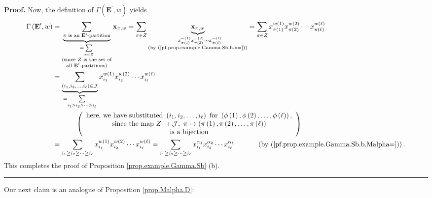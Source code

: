 \documentclass[numbers=enddot,12pt,final,onecolumn,notitlepage,abstracton]{scrartcl}
\theoremstyle{definition}
\newenvironment{proof}[1][Proof]{\noindent\textbf{#1.} }{\ \rule{0.5em}{0.5em}}
\let\sumnonlimits\sum
\renewcommand{\sum}{\sumnonlimits\limits}
\newenvironment{verlong}{}{}
\begin{document}
\begin{verlong}
\begin{footnotesize}
\begin{proof}
Now, the definition of $\Gamma\left(  \mathbf{E}^{\prime},w\right)  $ yields%
\begin{align*}
\Gamma\left(  {\mathbf{E}}^{\prime},w\right)   &  =\underbrace{\sum_{\pi\text{
is an }{\mathbf{E}}^{\prime}\text{-partition}}}_{\substack{=\sum_{\pi\in
Z}\\\text{(since }Z\text{ is the set of}\\\text{all }\mathbf{E}^{\prime
}\text{-partitions)}}}{\mathbf{x}}_{\pi,w}=\sum_{\pi\in Z}%
\underbrace{{\mathbf{x}}_{\pi,w}}_{\substack{=x_{\pi\left(  1\right)
}^{w\left(  1\right)  }x_{\pi\left(  2\right)  }^{w\left(  2\right)  }\cdots
x_{\pi\left(  \ell\right)  }^{w\left(  \ell\right)  }\\\text{(by
(\ref{pf.prop.example.Gamma.Sb.b.x=}))}}}=\sum_{\pi\in Z}x_{\pi\left(
1\right)  }^{w\left(  1\right)  }x_{\pi\left(  2\right)  }^{w\left(  2\right)
}\cdots x_{\pi\left(  \ell\right)  }^{w\left(  \ell\right)  }\\
&  =\underbrace{\sum_{\left(  i_{1},i_{2},\ldots,i_{\ell}\right)
\in\mathcal{J}}}_{=\sum_{i_{1}\geq i_{2}\geq\cdots\geq i_{\ell}}}x_{i_{1}%
}^{w\left(  1\right)  }x_{i_{2}}^{w\left(  2\right)  }\cdots x_{i_{\ell}%
}^{w\left(  \ell\right)  }\\
&  \ \ \ \ \ \ \ \ \ \ \left(
\begin{array}
[c]{c}%
\text{here, we have substituted }\left(  i_{1},i_{2},\ldots,i_{\ell}\right)
\text{ for }\left(  \phi\left(  1\right)  ,\phi\left(  2\right)  ,\ldots
,\phi\left(  \ell\right)  \right)  \text{,}\\
\text{since the map }Z\rightarrow\mathcal{J},\ \pi\mapsto\left(  \pi\left(
1\right)  ,\pi\left(  2\right)  ,\ldots,\pi\left(  \ell\right)  \right) \\
\text{is a bijection}%
\end{array}
\right) \\
&  =\sum_{i_{1}\geq i_{2}\geq\cdots\geq i_{\ell}}x_{i_{1}}^{w\left(  1\right)
}x_{i_{2}}^{w\left(  2\right)  }\cdots x_{i_{\ell}}^{w\left(  \ell\right)
}=\sum_{i_{1}\geq i_{2}\geq\cdots\geq i_{\ell}}x_{i_{1}}^{\alpha_{1}}x_{i_{2}%
}^{\alpha_{2}}\cdots x_{i_{\ell}}^{\alpha_{\ell}}\ \ \ \ \ \ \ \ \ \ \left(
\text{by (\ref{pf.prop.example.Gamma.Sb.b.Malpha=})}\right)  .
\end{align*}
This completes the proof of Proposition \ref{prop.example.Gamma.Sb} (b).
\end{proof}

Our next claim is an analogue of Proposition \ref{prop.Malpha.D}:


\end{footnotesize}
\end{verlong}
\end{document}

